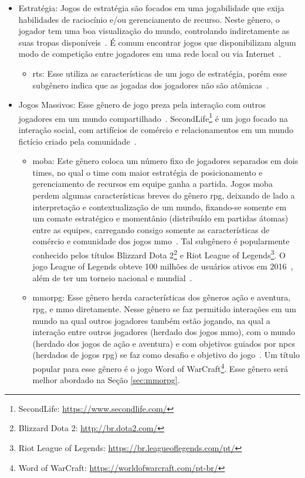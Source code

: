 \begin{itemize}
  \item Estratégia: Jogos de estratégia são focados em uma jogabilidade que exija habilidades de raciocínio e/ou gerenciamento de recurso. Neste gênero, o jogador tem uma boa visualização do mundo, controlando indiretamente as suas tropas disponíveis~\cite{rollings2003andrew}. É comum encontrar jogos que disponibilizam algum modo de competição entre jogadores em uma rede local ou via Internet~\cite{adams_1208533}.
    \begin{itemize}
      \item \ac{rts}: Esse utiliza as características de um jogo de estratégia, porém esse subgênero indica que as jogadas dos jogadores não são atômicas~\cite{adams_1208533}.
    \end{itemize}
  \item Jogos Massivos: Esse gênero de jogo preza pela interação com outros jogadores em um mundo compartilhado~\cite{adams_1208533}. SecondLife\footnote{SecondLife: \url{https://www.secondlife.com/}} é um jogo focado na interação social, com artifícios de comércio e relacionamentos em um mundo fictício criado pela comunidade~\cite{tecmundo_secondlife}.
    \begin{itemize}
      \item \ac{moba}: Este gênero coloca um número fixo de jogadores separados em dois times, no qual o time com maior estratégia de posicionamento e gerenciamento de recursos em equipe ganha a partida. Jogos \ac{moba} perdem algumas características breves do gênero \ac{rpg}, deixando de lado a interpretação e contextualização de um mundo, fixando-se somente em um comate estratégico e momentânio (distribuído em partidas átomas) entre as equipes, carregando consigo somente as características de comércio e comunidade dos jogos \ac{mmo}~\cite{adams_1208533}. Tal subgênero é popularmente conhecido pelos títulos Blizzard Dota 2\footnote{Blizzard Dota 2: \url{http://br.dota2.com/}} e Riot League of Legends\footnote{Riot League of Legends: \url{https://br.leagueoflegends.com/pt/}}. O jogo League of Legends obteve 100 milhões de usuários ativos em 2016~\cite{lol_statista}, além de ter um torneio nacional e mundial~\cite{lol_sportv}.
      \item \ac{mmorpg}: Esse gênero herda características dos gêneros ação e aventura, \ac{rpg}, e \ac{mmo} diretamente. Nesse gênero se faz permitido interações em um mundo na qual outros jogadores também estão jogando, na qual a interação entre outros jogadores (herdado dos jogos \ac{mmo}), com o mundo (herdado dos jogos de ação e aventura) e com objetivos guiados por \ac{npcs} (herdados de jogos \ac{rpg}) se faz como desafio e objetivo do jogo~\cite{adams_1208533}. Um título popular para esse gênero é o jogo Word of WarCraft\footnote{Word of WarCraft: \url{https://worldofwarcraft.com/pt-br/}}. Esse gênero será melhor abordado na Seção \ref{sec:mmorpg}.

\end{itemize}
\end{itemize}
